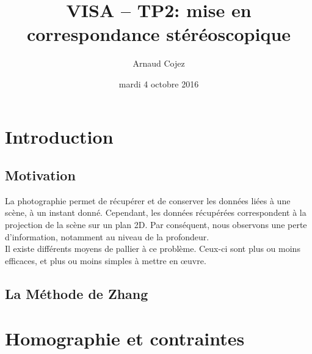 \documentclass[a4paper]{article}
\begin{document}
\title{VISA -- TP2: mise en correspondance stéréoscopique}
\author{Arnaud Cojez}
\date{mardi 4 octobre 2016}

\maketitle

\newpage
\tableofcontents
\newpage

\section{Introduction}

\subsection{Motivation}
La photographie permet de récupérer et de conserver les données liées à une scène, à un instant donné. Cependant, les données récupérées correspondent à la projection de la scène sur un plan 2D. Par conséquent, nous observons une perte d'information, notamment au niveau de la profondeur.\\

Il existe différents moyens de pallier à ce problème. Ceux-ci sont plus ou moins efficaces, et plus ou moins simples à mettre en œuvre.


\subsection{La Méthode de Zhang}

\clearpage

\section{Homographie et contraintes}

\clearpage
\end{document}
